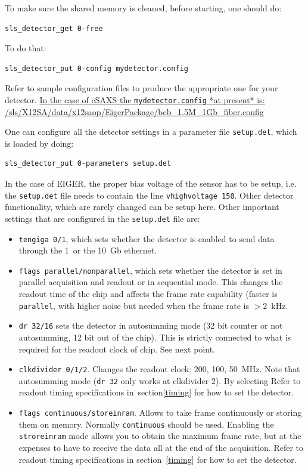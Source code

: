 \documentclass{article}
\newcommand{\E}{EIGER\xspace}
\begin{document}
To make sure the shared memory is cleaned, before starting, one should do:  
\begin{verbatim}
sls_detector_get 0-free
\end{verbatim}
To do that:
\begin{verbatim}
sls_detector_put 0-config mydetector.config
\end{verbatim}
Refer to sample configuration files to produce the appropriate one for your detector.
\underline{In the case of cSAXS the {\tt{mydetector.config}} *at present* is:}\\ 
\underline{/sls/X12SA/data/x12saop/EigerPackage/beb\_1.5M\_1Gb\_fiber.config}

One can configure all the detector settings in a parameter file {\tt{setup.det}}, which is loaded by doing:
\begin{verbatim}
sls_detector_put 0-parameters setup.det
\end{verbatim}

In the case of \E, the proper bias voltage of the sensor has to be setup, i.e. the {\tt{setup.det}} file needs to contain the line {\tt{vhighvoltage 150}}. Other detector functionality, which are rarely changed can be setup here. 
Other important settings that are configured in the {\tt{setup.det}} file are:
\begin{itemize}
\item {\tt{tengiga 0/1}}, which sets whether the detector is enabled to send data through the 1~or the 10~Gb ethernet.
\item {\tt{flags parallel/nonparallel}}, which sets whether the detector is set in parallel acquisition and readout or in sequential mode. This changes the readout time of the chip and affects the frame rate capability (faster is {\tt{parallel}}, with higher noise but needed when the frame rate is $>2$~kHz. 
\item {\tt{dr 32/16}} sets the detector in autosumming mode (32 bit counter or not autosumming, 12 bit out of the chip). This is strictly connected to what is required for the readout clock of chip. See next point.
\item {\tt{clkdivider 0/1/2}}. Changes the readout clock: 200, 100, 50~MHz. Note that autosumming mode ({\tt{dr 32}} only works at {clkdivider 2}). By selecting Refer to readout timing specifications in~section\ref{timing} for how to set the detector. 
\item {\tt{flags continuous/storeinram}}. Allows to take frame continuously or storing them on memory. Normally {\tt{continuous}} should be used. Enabling the  {\tt{stroreinram}} mode allows you to obtain the maximum frame rate, but at the expenses to have to receive the data all at the end of the acquisition. Refer to readout timing specifications in section~\ref{timing} for how to set the detector.
\end{itemize}
\end{document}
